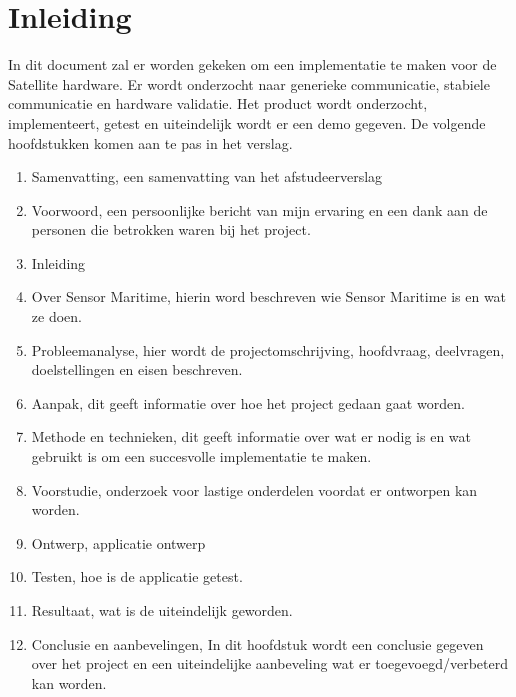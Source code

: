 \chapter{Inleiding}
In dit document zal er worden gekeken om een implementatie te maken voor de Satellite hardware. Er wordt onderzocht naar generieke communicatie, stabiele communicatie en hardware validatie. Het product wordt onderzocht, implementeert, getest en uiteindelijk wordt er een demo gegeven. De volgende hoofdstukken komen aan te pas in het verslag.
\begin{enumerate}
	\item Samenvatting, een samenvatting van het afstudeerverslag
	\item Voorwoord, een persoonlijke bericht van mijn ervaring en een dank aan de personen die betrokken waren bij het project.
	\item Inleiding
	\item Over Sensor Maritime, hierin word beschreven wie Sensor Maritime is en wat ze doen.
	\item Probleemanalyse, hier wordt de projectomschrijving, hoofdvraag, deelvragen, doelstellingen en eisen beschreven.
	\item Aanpak, dit geeft informatie over hoe het project gedaan gaat worden.
	\item Methode en technieken, dit geeft informatie over wat er nodig is en wat gebruikt is om een succesvolle implementatie te maken.
	\item Voorstudie, onderzoek voor lastige onderdelen voordat er ontworpen kan worden.
	\item Ontwerp, applicatie ontwerp
	\item Testen, hoe is de applicatie getest.
	\item Resultaat, wat is de uiteindelijk geworden.
	\item Conclusie en aanbevelingen, In dit hoofdstuk wordt een conclusie gegeven over het project en een uiteindelijke aanbeveling wat er toegevoegd/verbeterd kan worden.
\end{enumerate}